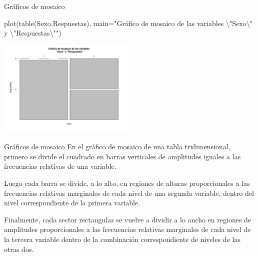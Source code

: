 \documentclass[
  ignorenonframetext,
  aspectratio=169]{beamer}
\newenvironment{Shaded}{\begin{snugshade}}{\end{snugshade}}
\newcommand{\AttributeTok}[1]{\textcolor[rgb]{0.77,0.63,0.00}{#1}}
\newcommand{\FunctionTok}[1]{\textcolor[rgb]{0.00,0.00,0.00}{#1}}
\newcommand{\NormalTok}[1]{#1}
\newcommand{\SpecialCharTok}[1]{\textcolor[rgb]{0.00,0.00,0.00}{#1}}
\newcommand{\StringTok}[1]{\textcolor[rgb]{0.31,0.60,0.02}{#1}}
\begin{document}
\begin{frame}[fragile]{Gráficos de mosaico}
\protect\hypertarget{gruxe1ficos-de-mosaico-1}{}
\begin{Shaded}
\begin{Highlighting}[]
\FunctionTok{plot}\NormalTok{(}\FunctionTok{table}\NormalTok{(Sexo,Respuestas), }
\AttributeTok{main=}\StringTok{"Gráfico de mosaico de las variables}
\StringTok{  }\SpecialCharTok{\textbackslash{}"}\StringTok{Sexo}\SpecialCharTok{\textbackslash{}"}\StringTok{ y }\SpecialCharTok{\textbackslash{}"}\StringTok{Respuestas}\SpecialCharTok{\textbackslash{}"}\StringTok{"}\NormalTok{)}
\end{Highlighting}
\end{Shaded}

\begin{center}\includegraphics[width=250px]{Hora3_files/figure-beamer/unnamed-chunk-41-1} \end{center}
\end{frame}

\begin{frame}{Gráficos de mosaico}
\protect\hypertarget{gruxe1ficos-de-mosaico-2}{}
En el gráfico de mosaico de una tabla tridimensional, primero se divide
el cuadrado en barras verticales de amplitudes iguales a las frecuencias
relativas de una variable.

Luego cada barra se divide, a lo alto, en regiones de alturas
proporcionales a las frecuencias relativas marginales de cada nivel de
una segunda variable, dentro del nivel correspondiente de la primera
variable.

Finalmente, cada sector rectangular se vuelve a dividir a lo ancho en
regiones de amplitudes proporcionales a las frecuencias relativas
marginales de cada nivel de la tercera variable dentro de la combinación
correspondiente de niveles de las otras dos.
\end{frame}
\end{document}
